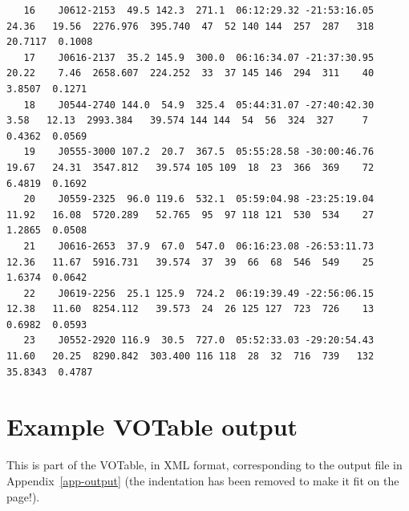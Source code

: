 \documentclass[12pt,a4paper]{article}
\begin{document}
\begin{landscape}
{\begin{verbatim}
   16    J0612-2153  49.5 142.3  271.1  06:12:29.32 -21:53:16.05   24.36   19.56  2276.976  395.740  47  52 140 144  257  287   318   20.7117  0.1008
   17    J0616-2137  35.2 145.9  300.0  06:16:34.07 -21:37:30.95   20.22    7.46  2658.607  224.252  33  37 145 146  294  311    40    3.8507  0.1271
   18    J0544-2740 144.0  54.9  325.4  05:44:31.07 -27:40:42.30    3.58   12.13  2993.384   39.574 144 144  54  56  324  327     7    0.4362  0.0569
   19    J0555-3000 107.2  20.7  367.5  05:55:28.58 -30:00:46.76   19.67   24.31  3547.812   39.574 105 109  18  23  366  369    72    6.4819  0.1692
   20    J0559-2325  96.0 119.6  532.1  05:59:04.98 -23:25:19.04   11.92   16.08  5720.289   52.765  95  97 118 121  530  534    27    1.2865  0.0508
   21    J0616-2653  37.9  67.0  547.0  06:16:23.08 -26:53:11.73   12.36   11.67  5916.731   39.574  37  39  66  68  546  549    25    1.6374  0.0642
   22    J0619-2256  25.1 125.9  724.2  06:19:39.49 -22:56:06.15   12.38   11.60  8254.112   39.573  24  26 125 127  723  726    13    0.6982  0.0593
   23    J0552-2920 116.9  30.5  727.0  05:52:33.03 -29:20:54.43   11.60   20.25  8290.842  303.400 116 118  28  32  716  739   132   35.8343  0.4787
  \end{verbatim}
}


\newpage
\section{Example VOTable output}
\label{app-votable}
This is part of the VOTable, in XML format, corresponding to the
output file in Appendix~\ref{app-output} (the indentation has been removed to make it fit on the page!).


\end{landscape}
\end{document}
